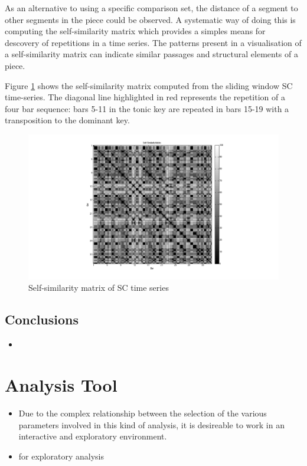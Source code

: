 \documentclass{article}
\begin{document}
As an alternative to using a specific comparison set, the distance of
a segment to other segments in the piece could be observed. A
systematic way of doing this is computing the self-similarity matrix
which provides a simples means for descovery of repetitions in a time
series. The patterns present in a visualisation of a self-similarity
matrix can indicate similar passages and structural elements of a
piece.

Figure \ref{fig:selfsimmat} shows the self-similarity matrix computed
from the sliding window SC time-series. The diagonal line highlighted
in red represents the repetition of a four bar sequence: bars 5-11 in
the tonic key are repeated in bars 15-19 with a transposition to the
dominant key.

\begin{figure}[htb]
\centering
\includegraphics[width=.9\linewidth]{../plots/selfsimmat.png}
\caption{\label{fig:selfsimmat}Self-similarity matrix of SC time series}
\end{figure}
\subsection{Conclusions}
\label{sec-9-4}

\begin{itemize}
\item 
\end{itemize}
\section{Analysis Tool}
\label{sec-10}

\begin{itemize}
\item Due to the complex relationship between the selection of the various
  parameters involved in this kind of analysis, it is desireable to
  work in an interactive and exploratory environment.
\item for exploratory analysis
\end{itemize}
\end{document}
